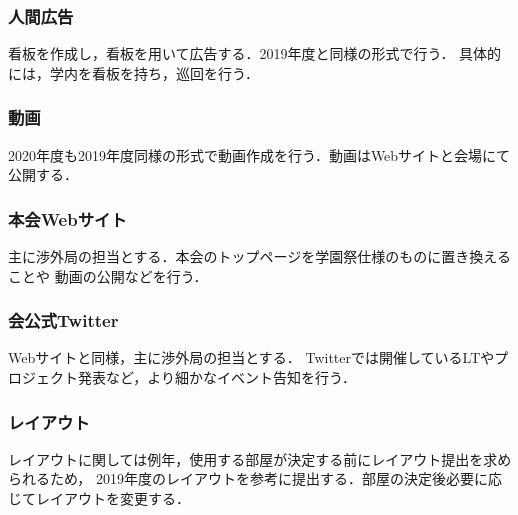 \subsubsection*{人間広告}
看板を作成し，看板を用いて広告する．2019年度と同様の形式で行う．
具体的には，学内を看板を持ち，巡回を行う．

\subsubsection*{動画}
2020年度も2019年度同様の形式で動画作成を行う．動画はWebサイトと会場にて公開する．


\subsubsection*{本会Webサイト}
主に渉外局の担当とする．本会のトップページを学園祭仕様のものに置き換えることや
動画の公開などを行う．

\subsubsection*{会公式Twitter}
Webサイトと同様，主に渉外局の担当とする．
Twitterでは開催しているLTやプロジェクト発表など，より細かなイベント告知を行う．

\subsubsection*{レイアウト}
レイアウトに関しては例年，使用する部屋が決定する前にレイアウト提出を求められるため，
2019年度のレイアウトを参考に提出する．部屋の決定後必要に応じてレイアウトを変更する．

